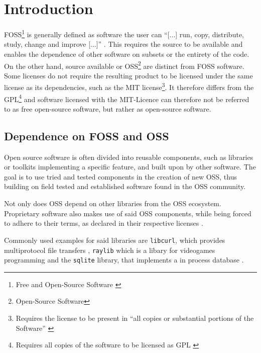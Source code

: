 \section{Introduction}

FOSS\footnote{Free and Open-Source Software \cite{stallmann2021copyleft}} is
generally defined as software the user can ``[...] run, copy, distribute,
study, change and improve [...]'' \cite{fsf2024whycopylef}. This requires the
source to be available and enables the dependence of other software on subsets
or the entirety of the code. On the other hand, source available or
OSS\footnote{Open-Source Software} are distinct from FOSS software. Some
licenses do not require the resulting product to be licensed under the same
license as its dependencies, such as the MIT license\footnote{Requires the
license to be present in ``all copies or substantial portions of the Software''
\cite{osorg2024mit}}. It therefore differs from the GPL\footnote{Requires all
copies of the software to be licensed as GPL \cite{osorg2024gpl}} and software
licensed with the MIT-Licence can therefore not be referred to as free
open-source software, but rather as open-source software.



\subsection{Dependence on FOSS and OSS}
Open source software is often divided into reusable components, such as
libraries or toolkits implementing a specific feature, and built upon by other
software. The goal is to use tried and tested components in the creation of new
OSS, thus building on field tested and established software found in the OSS
community.

Not only does OSS depend on other libraries from the OSS ecosystem. Proprietary
software also makes use of said OSS components, while being forced to adhere to
their terms, as declared in their respective licenses \cite{libcurl2024usage}. 

Commonly used examples for said libraries are \texttt{libcurl}, which provides
multiprotocol file transfers \cite{libcurl2024overview}, \texttt{raylib} which
is a libary for videogames programming \cite{raylib2024landing} and the
\texttt{sqlite} library, that implements a in process database
\cite{sqlite2024landing}.

